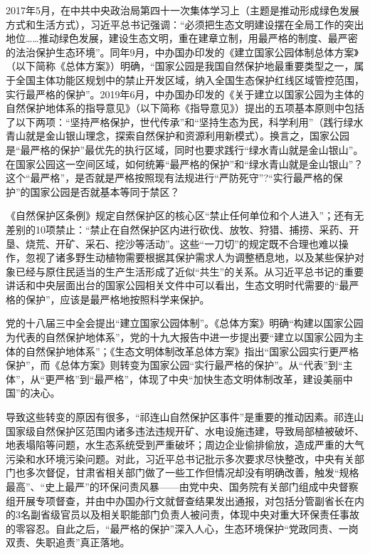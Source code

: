 \documentclass[]{book}
\begin{document}
2017年5月，在中共中央政治局第四十一次集体学习上（主题是推动形成绿色发展方式和生活方式），习近平总书记强调：``必须把生态文明建设摆在全局工作的突出地位\ldots{}\ldots{}推动绿色发展，建设生态文明，重在建章立制，用最严格的制度、最严密的法治保护生态环境''。同年9月，中办国办印发的《建立国家公园体制总体方案》（以下简称《总体方案》）明确，``国家公园是我国自然保护地最重要类型之一，属于全国主体功能区规划中的禁止开发区域，纳入全国生态保护红线区域管控范围，实行最严格的保护''。2019年6月，中办国办印发的《关于建立以国家公园为主体的自然保护地体系的指导意见》（以下简称《指导意见》）提出的五项基本原则中包括了以下两项：``坚持严格保护，世代传承''和``坚持生态为民，科学利用''（践行绿水青山就是金山银山理念，探索自然保护和资源利用新模式）。换言之，国家公园是``最严格的保护''最优先的执行区域，同时也要求践行``绿水青山就是金山银山''。在国家公园这一空间区域，如何统筹``最严格的保护''和``绿水青山就是金山银山''？这个``最严格''，是否就是严格按照现有法规进行``严防死守''?``实行最严格的保护''的国家公园是否就基本等同于禁区？

《自然保护区条例》规定自然保护区的核心区``禁止任何单位和个人进入''；还有无差别的10项禁止：``禁止在自然保护区内进行砍伐、放牧、狩猎、捕捞、采药、开垦、烧荒、开矿、采石、挖沙等活动''。这些``一刀切''的规定既不合理也难以操作，忽视了诸多野生动植物需要根据其保护需求人为调整栖息地，以及某些保护对象已经与原住民适当的生产生活形成了近似``共生''的关系。从习近平总书记的重要讲话和中央层面出台的国家公园相关文件中可以看出，生态文明时代需要的``最严格的保护''，应该是最严格地按照科学来保护。

党的十八届三中全会提出``建立国家公园体制''。《总体方案》明确``构建以国家公园为代表的自然保护地体系''，党的十九大报告中进一步提出要``建立以国家公园为主体的自然保护地体系''；《生态文明体制改革总体方案》指出``国家公园实行更严格保护''，而《总体方案》则转变为国家公园``实行最严格的保护''。从``代表''到``主体''，从``更严格''到``最严格''，体现了中央``加快生态文明体制改革，建设美丽中国''的决心。

导致这些转变的原因有很多，``祁连山自然保护区事件''是重要的推动因素。祁连山国家级自然保护区范围内诸多违法违规开矿、水电设施违建，导致局部植被破坏、地表塌陷等问题，水生态系统受到严重破坏；周边企业偷排偷放，造成严重的大气污染和水环境污染问题。对此，习近平总书记批示多次要求尽快整改，中央有关部门也多次督促，甘肃省相关部门做了一些工作但情况却没有明确改善，触发``规格最高''、``史上最严''的环保问责风暴------由党中央、国务院有关部门组成中央督察组开展专项督查，并由中办国办行文就督查结果发出通报，对包括分管副省长在内的3名副省级官员以及相关职能部门负责人被问责，体现中央对重大环保责任事故的零容忍。自此之后，``最严格的保护''深入人心，生态环境保护``党政同责、一岗双责、失职追责''真正落地。
\end{document}
